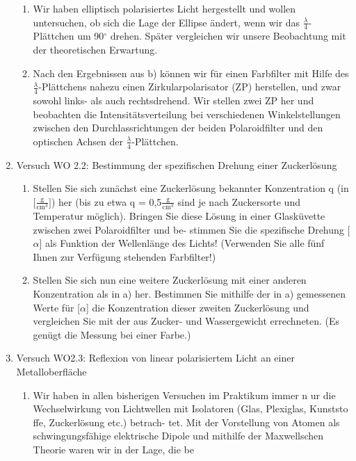 \documentclass[12pt]{scrartcl}
\begin{document}
\begin{enumerate}
\begin{enumerate}
\item Wir haben elliptisch polarisiertes Licht hergestellt und wollen untersuchen, ob sich die Lage der Ellipse ändert, wenn wir das $\frac{\lambda}{4}$-Plättchen um 90$^\circ$
drehen. Später vergleichen wir unsere Beobachtung mit der theoretischen Erwartung.
\item Nach den Ergebnissen aus b) können wir für einen Farbfilter mit Hilfe des $\frac{\lambda}{4}$-Plättchens nahezu einen Zirkularpolarisator (ZP) herstellen, und zwar sowohl links- als auch rechtsdrehend. Wir stellen zwei ZP her und beobachten die Intensitätsverteilung bei verschiedenen Winkelstellungen zwischen den Durchlassrichtungen der beiden Polaroidfilter und den optischen Achsen der $\frac{\lambda}{4}$-Plättchen.
\end{enumerate}
\item Versuch WO 2.2: Bestimmung der spezifischen Drehung
einer Zuckerlösung\\
\begin{enumerate}
\item Stellen Sie sich zunächst eine Zuckerlösung bekannter Konzentration q (in [$\frac{\text{g}}{\text{cm}^3}]$)
her (bis zu etwa q = 0,5$\frac{\text{g}}{\text{cm}^3}$
sind je nach Zuckersorte und Temperatur möglich).
Bringen Sie diese Lösung in einer Glasküvette zwischen zwei Polaroidfilter und be-
stimmen Sie die spezifische Drehung [$\alpha$]
als Funktion der Wellenlänge des Lichts!
(Verwenden Sie alle fünf Ihnen zur Verfügung stehenden Farbfilter!)
\item Stellen Sie sich nun eine weitere Zuckerlösung mit einer anderen Konzentration als
in a) her. Bestimmen Sie mithilfe der in a) gemessenen Werte für
[$\alpha$] die Konzentration dieser zweiten Zuckerlösung und vergleichen Sie mit der aus Zucker- und
Wassergewicht errechneten. (Es genügt die Messung bei einer Farbe.)
\end{enumerate}
\item Versuch WO2.3: Reflexion von linear polarisiertem Licht an
einer Metalloberfläche\\
\begin{enumerate}
\item Wir haben in allen bisherigen Versuchen im Praktikum immer n
ur die Wechselwirkung
von Lichtwellen mit Isolatoren (Glas, Plexiglas, Kunststo
ffe, Zuckerlösung etc.) betrach-
tet. Mit der Vorstellung von Atomen als schwingungsfähige elektrische Dipole und mithilfe der Maxwellschen Theorie waren wir in der Lage, die be

\end{enumerate}
\end{enumerate}
\end{document}
